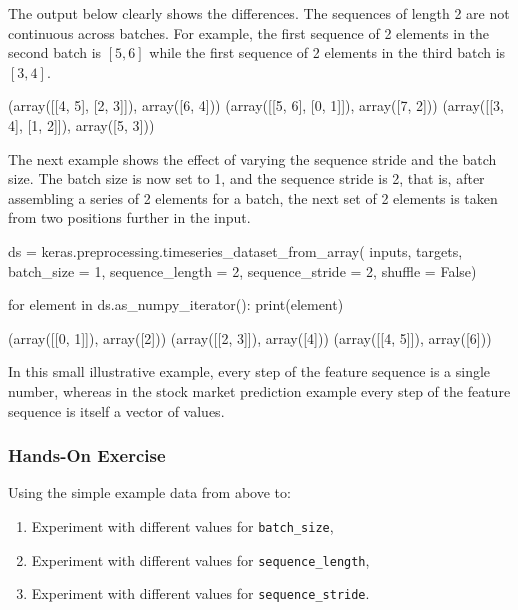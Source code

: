 The output below clearly shows the differences. The sequences of length 2 are not continuous across batches. For example, the first sequence of 2 elements in the second batch is $[5, 6]$ while the first sequence of 2 elements in the third batch is $[3, 4]$.

\begin{samepage}
\begin{textcode}
(array([[4, 5],
       [2, 3]]), array([6, 4]))
(array([[5, 6],
       [0, 1]]), array([7, 2]))
(array([[3, 4],
       [1, 2]]), array([5, 3]))
\end{textcode}
\end{samepage}

The next example shows the effect of varying the sequence stride and the batch size. The batch size is now set to 1, and the sequence stride is 2, that is, after assembling a series of 2 elements for a batch, the next set of 2 elements is taken from two positions further in the input.

\begin{samepage}
\begin{pythoncode}
ds = keras.preprocessing.timeseries_dataset_from_array(
     inputs, 
     targets,
     batch_size = 1, 
     sequence_length = 2, 
     sequence_stride = 2, 
     shuffle = False)
     
for element in ds.as_numpy_iterator():
     print(element)
\end{pythoncode}
\end{samepage}

\begin{samepage}
\begin{textcode}
(array([[0, 1]]), array([2]))
(array([[2, 3]]), array([4]))
(array([[4, 5]]), array([6]))
\end{textcode}
\end{samepage}

In this small illustrative example, every step of the feature sequence is a single number, whereas in the stock market prediction example every step of the feature sequence is itself a vector of values.


\begin{tcolorbox}[colback=code]
\subsubsection*{Hands-On Exercise} 
Using the simple example data from above to:
\begin{enumerate}
   \item Experiment with different values for \texttt{batch\_size},
   \item Experiment with different values for \texttt{sequence\_length},
   \item Experiment with different values for \texttt{sequence\_stride}.
\end{enumerate}
\end{tcolorbox}

